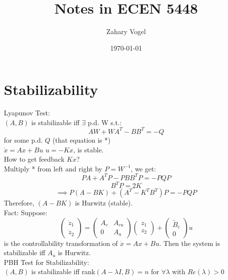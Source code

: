 \documentclass{article}
\author{Zahary Vogel}
\date{\today}
\title{Notes in ECEN 5448}
\begin{document}
\maketitle


\section{Stabilizability}
Lyapunov Test:\\
$(A,B)$ is stabilizable iff $\exists$ p.d. W s.t.:
\[AW+WA^T-BB^T=-Q\]
for some p.d. $Q$ (that equation is *)\\

$\dot{x}=Ax+Bu$ $u=-Kx$, is stable.\\
How to get feedback $Kx$?\\
Multiply * from left and right by $P=W^{-1}$, we get:
\[PA+A^TP-PBB^TP=-PQP\]
\[B^TP=2K\]
\[\implies P(A-BK)+(A^T-K^TB^T)P=-PQP\]
Therefore, $(A-BK)$ is Hurwitz (stable).\\

Fact: Suppose:
\[\begin{pmatrix}\dot{z}_1\\\dot{z}_2\end{pmatrix}=\begin{pmatrix}A_c & A_{cu}\\0&A_{u}\end{pmatrix}\begin{pmatrix}z_1\\z_2\end{pmatrix}+\begin{pmatrix}\tilde{B}_c\\0\end{pmatrix}u\]
is the controllability transformation of $\dot{x}=Ax+Bu$. Then the system is stabilizable iff  $A_u$ is Hurwitz.\\

PBH Test for Stabilizability:\\
$(A,B)$ is stabilizable iff rank$(A-\lambda I, B)=n$ for $\forall \lambda$ with $Re(\lambda)>0$\\
\end{document}

